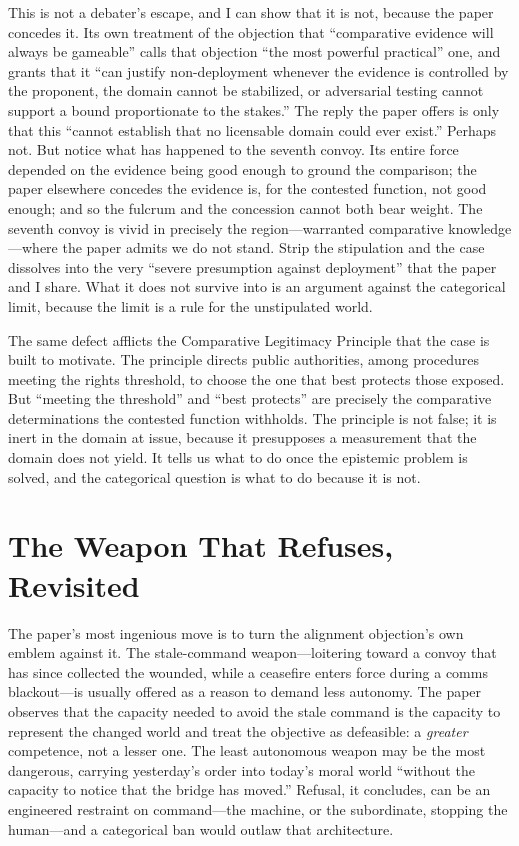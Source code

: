 \documentclass[11pt]{article}
\begin{document}
This is not a debater's escape, and I can show that it is not, because the paper concedes it. Its own treatment of the objection that ``comparative evidence will always be gameable'' calls that objection ``the most powerful practical'' one, and grants that it ``can justify non-deployment whenever the evidence is controlled by the proponent, the domain cannot be stabilized, or adversarial testing cannot support a bound proportionate to the stakes.'' The reply the paper offers is only that this ``cannot establish that no licensable domain could ever exist.'' Perhaps not. But notice what has happened to the seventh convoy. Its entire force depended on the evidence being good enough to ground the comparison; the paper elsewhere concedes the evidence is, for the contested function, not good enough; and so the fulcrum and the concession cannot both bear weight. The seventh convoy is vivid in precisely the region---warranted comparative knowledge---where the paper admits we do not stand. Strip the stipulation and the case dissolves into the very ``severe presumption against deployment'' that the paper and I share. What it does not survive into is an argument against the categorical limit, because the limit is a rule for the unstipulated world.

The same defect afflicts the Comparative Legitimacy Principle that the case is built to motivate. The principle directs public authorities, among procedures meeting the rights threshold, to choose the one that best protects those exposed. But ``meeting the threshold'' and ``best protects'' are precisely the comparative determinations the contested function withholds. The principle is not false; it is inert in the domain at issue, because it presupposes a measurement that the domain does not yield. It tells us what to do once the epistemic problem is solved, and the categorical question is what to do because it is not.

\section{The Weapon That Refuses, Revisited}
\label{sec:refuse}

The paper's most ingenious move is to turn the alignment objection's own emblem against it. The stale-command weapon---loitering toward a convoy that has since collected the wounded, while a ceasefire enters force during a comms blackout---is usually offered as a reason to demand less autonomy. The paper observes that the capacity needed to avoid the stale command is the capacity to represent the changed world and treat the objective as defeasible: a \emph{greater} competence, not a lesser one. The least autonomous weapon may be the most dangerous, carrying yesterday's order into today's moral world ``without the capacity to notice that the bridge has moved.'' Refusal, it concludes, can be an engineered restraint on command---the machine, or the subordinate, stopping the human---and a categorical ban would outlaw that architecture.
\end{document}
